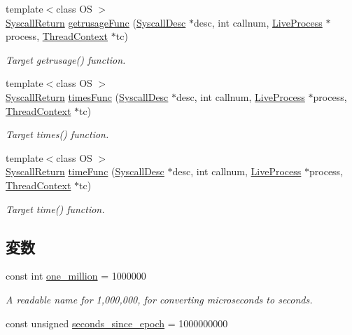 \begin{DoxyCompactItemize}
{\footnotesize template$<$class OS $>$ }\\\hyperlink{classSyscallReturn}{SyscallReturn} \hyperlink{syscall__emul_8hh_aa7d05f11e84b91416b82898ca0233e20}{getrusageFunc} (\hyperlink{classSyscallDesc}{SyscallDesc} $\ast$desc, int callnum, \hyperlink{classLiveProcess}{LiveProcess} $\ast$process, \hyperlink{classThreadContext}{ThreadContext} $\ast$tc)
\begin{DoxyCompactList}\small\item\em Target getrusage() function. \item\end{DoxyCompactList}\item 
{\footnotesize template$<$class OS $>$ }\\\hyperlink{classSyscallReturn}{SyscallReturn} \hyperlink{syscall__emul_8hh_af669a50393a3e59f5d77210b44b8c645}{timesFunc} (\hyperlink{classSyscallDesc}{SyscallDesc} $\ast$desc, int callnum, \hyperlink{classLiveProcess}{LiveProcess} $\ast$process, \hyperlink{classThreadContext}{ThreadContext} $\ast$tc)
\begin{DoxyCompactList}\small\item\em Target times() function. \item\end{DoxyCompactList}\item 
{\footnotesize template$<$class OS $>$ }\\\hyperlink{classSyscallReturn}{SyscallReturn} \hyperlink{syscall__emul_8hh_ac73c74c47ae346b8e74a8d60682c3211}{timeFunc} (\hyperlink{classSyscallDesc}{SyscallDesc} $\ast$desc, int callnum, \hyperlink{classLiveProcess}{LiveProcess} $\ast$process, \hyperlink{classThreadContext}{ThreadContext} $\ast$tc)
\begin{DoxyCompactList}\small\item\em Target time() function. \item\end{DoxyCompactList}\end{DoxyCompactItemize}
\subsection*{変数}
\begin{DoxyCompactItemize}
\item 
const int \hyperlink{syscall__emul_8hh_a669e0ac171376b8be956f4ac131e78a7}{one\_\-million} = 1000000
\begin{DoxyCompactList}\small\item\em A readable name for 1,000,000, for converting microseconds to seconds. \item\end{DoxyCompactList}\item 
const unsigned \hyperlink{syscall__emul_8hh_a39e588dacd751ca716fd5352f319e401}{seconds\_\-since\_\-epoch} = 1000000000
\end{DoxyCompactItemize}


